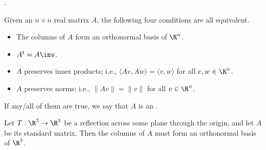 





{}.  

Given an $n\times n$ real matrix $A$, the following four conditions are all equivalent.

\begin{itemize}
\item
The columns of $A$ form an orthonormal basis of $\R^n$.  
\item
$A^t = A\inv$.  
\item
$A$ preserves inner products; i.e., $\langle Av,Aw\rangle = \langle v,w\rangle$ for all $v,w\in \R^n$.
\item
$A$ preserves norms; i.e., $\| Av\| = \|v\|$ for all $v\in \R^n$.
\end{itemize}

If any/all of them are true, we say that $A$ is an {}.  

\endedxtext



Let $T: \R^3 \rightarrow \R^3$ be a reflection across some plane through the origin, and let $A$ be its
standard matrix.  Then the columns of $A$ must form an orthonormal basis of $\R^3$.  






\endedxproblem


\endedxvertical





